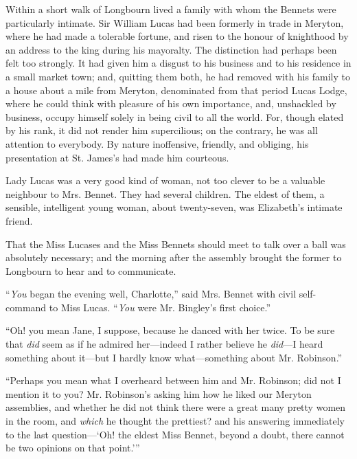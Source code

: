 Within a short walk of Longbourn lived a family with whom the Bennets were particularly intimate. Sir William Lucas had been formerly in trade in Meryton, where he had made a tolerable fortune, and risen to the honour of knighthood by an address to the king during his mayoralty. The distinction had perhaps been felt too strongly. It had given him a disgust to his business and to his residence in a small market town; and, quitting them both, he had removed with his family to a house about a mile from Meryton, denominated from that period Lucas Lodge, where he could think with pleasure of his own importance, and, unshackled by business, occupy himself solely in being civil to all the world. For, though elated by his rank, it did not render him supercilious; on the contrary, he was all attention to everybody. By nature inoffensive, friendly, and obliging, his presentation at St. James's had made him courteous.

Lady Lucas was a very good kind of woman, not too clever to be a valuable neighbour to Mrs. Bennet. They had several children. The eldest of them, a sensible, intelligent young woman, about twenty-seven, was Elizabeth's intimate friend.

That the Miss Lucases and the Miss Bennets should meet to talk over a ball was absolutely necessary; and the morning after the assembly brought the former to Longbourn to hear and to communicate.

“{\em You} began the evening well, Charlotte,” said Mrs. Bennet with civil self-command to Miss Lucas. “{\em You} were Mr. Bingley's first choice.”


“Oh! you mean Jane, I suppose, because he danced with her twice. To be sure that {\em did} seem as if he admired her---indeed I rather believe he {\em did}---I heard something about it---but I hardly know what---something about Mr. Robinson.”

“Perhaps you mean what I overheard between him and Mr. Robinson; did not I mention it to you? Mr. Robinson's asking him how he liked our Meryton assemblies, and whether he did not think there were a great many pretty women in the room, and {\em which} he thought the prettiest? and his answering immediately to the last question---‘Oh! the eldest Miss Bennet, beyond a doubt, there cannot be two opinions on that point.'”


